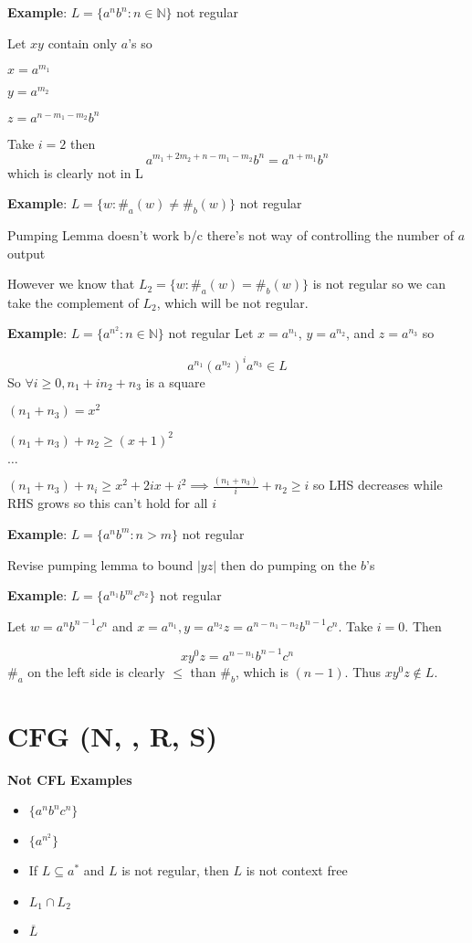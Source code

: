 \documentclass{article}
\begin{document}
  \textbf{Example}: $L = \{a^nb^n \colon n \in \mathbb{N}\}$ not regular

  Let $xy$ contain only $a$'s so

  $x = a^{m_1}$

  $y = a^{m_2}$

  $z = a^{n-m_1-m_2}b^n$

  Take $i = 2$ then
  \[a^{m_1 + 2m_2 + n - m_1 - m_2}b^n = a^{n + m_1}b^{n}\] 
   which is clearly not in L\bigskip

  \textbf{Example}: $L = \{w \colon \#_a(w) \neq \#_b(w)\}$ not regular

  Pumping Lemma doesn't work b/c there's not way of controlling the number of $a$ output

  However we know that $L_2= \{w \colon \#_a(w) = \#_b(w)\}$ is not regular so we can take the complement of $L_2$, which will be not regular. \bigskip

  \textbf{Example}: $L = \{a^{n^2} \colon n \in \mathbb{N}\}$  not regular
  Let $x = a^{n_1}$, $y = a^{n_2}$, and $z = a^{n_3}$ so

  \[a^{n_1}(a^{n_2})^ia^{n_3} \in L\]
  So $\forall i \geq 0, n_1 + in_2 + n_3$ is a square

  $(n_1 + n_3) = x^2$

  $(n_1 + n_3) + n_2 \geq (x+1)^2$

  $\ldots$

  $(n_1 + n_3) + n_i \geq x^2 + 2ix + i^2 \implies \frac{(n_1 + n_3)}{i} + n_2 \geq i$ so LHS decreases while RHS grows so this can't hold for all $i$ \bigskip

  \textbf{Example}: $L = \{a^nb^m \colon n > m\}$ not regular

  Revise pumping lemma to bound $|yz|$ then do pumping on the $b$'s \bigskip

  \textbf{Example}: $L = \{a^{n_1}b^mc^{n_2}\}$ not regular

  Let $w = a^n b^{n-1} c^n$ and $x = a^{n_1}, y = a^{n_2} z = a^{n - n_1 - n_2}b^{n-1}c^n$. Take $i = 0$. Then

  \[xy^0z = a^{n-n_1}b^{n-1}c^n\]
  $\#_a$ on the left side is clearly $\leq$ than $\#_b$, which is $(n-1)$. Thus $xy^0z \not\in L$.
  \section{CFG (N, \Sigma, R, S)}
  \textbf{Not CFL Examples}
  \begin{itemize}
    \item $\{a^n b^n c^n\}$
    \item $\{a^{n^2}\}$
    \item If $L \subseteq a^*$ and $L$ is not regular, then $L$ is not context free
    \item $L_1 \cap L_2$
    \item $\overline{L}$
  \end{itemize}
\end{document}
